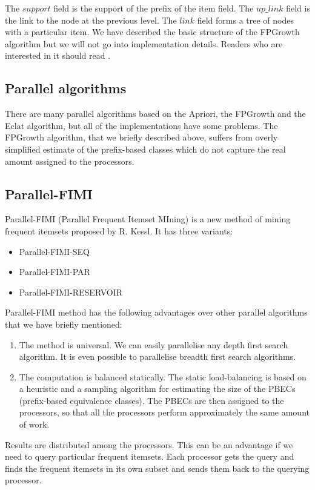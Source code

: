 \documentclass[journal]{IEEEtran/IEEEtran}
\begin{document}
The $support$ field is the support of the prefix of the item field. The $up\_link$ field is the link to the node at the previous level. The $link$ field forms a tree of nodes with a particular item. We have described the basic structure of the FPGrowth algorithm but we will not go into implementation details. Readers who are interested in it should read \cite{kessl}.
\subsection{Parallel algorithms}
There are many parallel algorithms based on the Apriori, the FPGrowth and the Eclat algorithm, but all of the implementations have some problems. The FPGrowth algorithm, that we briefly described above, suffers from overly simplified estimate of the prefix-based classes which do not capture the real amount assigned to the processors.
\subsection{Parallel-FIMI}
Parallel-FIMI (Parallel Frequent Itemset MIning) is a new method of mining frequent itemsets proposed by R. Kessl\cite{kessl}. It has three variants:
\begin{itemize}
\item Parallel-FIMI-SEQ
\item Parallel-FIMI-PAR
\item Parallel-FIMI-RESERVOIR
\end{itemize}

Parallel-FIMI method has the following advantages over other parallel algorithms that we have briefly mentioned:
\begin{enumerate}
\item The method is universal. We can easily parallelise any depth first search algorithm. It is even possible to parallelise breadth first search algorithms.
\item The computation is balanced statically. The static load-balancing is based on a heuristic and a sampling algorithm for estimating the size of the PBECs (prefix-based equivalence classes). The PBECs are then assigned to the processors, so that all the processors perform approximately the same amount of work.
\end{enumerate}

Results are distributed among the processors. This can be an advantage if we need to query particular frequent itemsets. Each processor gets the query and finds the frequent itemsets in its own subset and sends them back to the querying processor.\\
\end{document}
